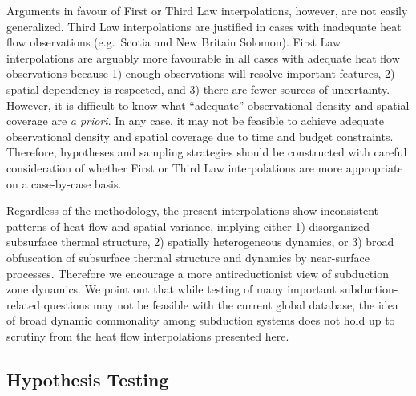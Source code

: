 \documentclass[draft,linenumbers]{agujournal2018}
\begin{document}
Arguments in favour of First or Third Law interpolations, however, are
not easily generalized. Third Law interpolations are justified in cases
with inadequate heat flow observations (e.g.~Scotia and New Britain
Solomon). First Law interpolations are arguably more favourable in all
cases with adequate heat flow observations because 1) enough
observations will resolve important features, 2) spatial dependency is
respected, and 3) there are fewer sources of uncertainty. However, it is
difficult to know what ``adequate'' observational density and spatial
coverage are \emph{a priori}. In any case, it may not be feasible to
achieve adequate observational density and spatial coverage due to time
and budget constraints. Therefore, hypotheses and sampling strategies
should be constructed with careful consideration of whether First or
Third Law interpolations are more appropriate on a case-by-case basis.

Regardless of the methodology, the present interpolations show
inconsistent patterns of heat flow and spatial variance, implying either
1) disorganized subsurface thermal structure, 2) spatially heterogeneous
dynamics, or 3) broad obfuscation of subsurface thermal structure and
dynamics by near-surface processes. Therefore we encourage a more
antireductionist view of subduction zone dynamics. We point out that
while testing of many important subduction-related questions may not be
feasible with the current global database, the idea of broad dynamic
commonality among subduction systems does not hold up to scrutiny from
the heat flow interpolations presented here.

\subsection{Hypothesis Testing}
\end{document}
